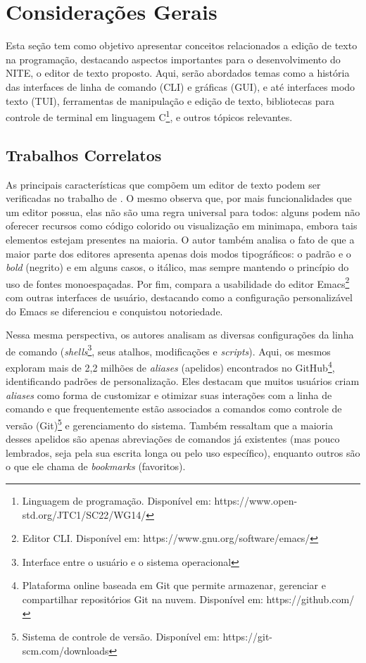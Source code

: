 \chapter{Considerações Gerais}
\label{cap:02}

Esta seção tem como objetivo apresentar conceitos relacionados a edição de texto
na programação, destacando aspectos importantes para o desenvolvimento do NITE,
o editor de texto proposto. Aqui, serão abordados temas como a história das
interfaces de linha de comando (CLI) e gráficas (GUI), e até interfaces modo texto
(TUI), ferramentas de manipulação e edição de texto, bibliotecas para controle de
terminal em linguagem C\footnote{Linguagem de programação. Disponível em: https://www.open-std.org/JTC1/SC22/WG14/},
e outros tópicos relevantes.

\section{Trabalhos Correlatos}

As principais características que compõem um editor de texto podem ser verificadas no
trabalho de . O mesmo observa que, por mais
funcionalidades que um editor possua, elas não são uma
regra universal para todos: alguns podem não oferecer recursos como código colorido
ou visualização em minimapa, embora tais elementos estejam presentes na maioria.
O autor também analisa o fato de que a maior parte dos editores apresenta apenas
dois modos tipográficos: o padrão e o \textit{bold} (negrito) e em alguns casos,
o itálico, mas sempre mantendo o princípio do uso de fontes monoespaçadas. Por
fim, compara a usabilidade do editor Emacs\footnote{Editor CLI. Disponível
em: https://www.gnu.org/software/emacs/} com outras interfaces de usuário, destacando
como a configuração personalizável do Emacs se diferenciou e conquistou notoriedade.

Nessa mesma perspectiva, os autores  analisam as diversas
configurações da linha de comando (\textit{shells}\footnote{Interface entre o
usuário e o sistema operacional}, seus atalhos, modificações e \textit{scripts}). Aqui, os
mesmos exploram mais de 2,2 milhões de \textit{aliases} (apelidos) encontrados
no GitHub\footnote{Plataforma online baseada em Git que permite armazenar, gerenciar
e compartilhar repositórios Git na nuvem. Disponível em: https://github.com/},
identificando padrões de personalização. Eles destacam que muitos usuários criam
\textit{aliases} como forma de customizar e otimizar suas interações com a linha
de comando e que frequentemente estão associados a comandos como controle de
versão (Git)\footnote{Sistema de controle de versão. Disponível em: https://git-scm.com/downloads}
e gerenciamento do sistema. Também ressaltam que a maioria desses apelidos são
apenas abreviações de comandos já existentes (mas pouco lembrados, seja pela sua
escrita longa ou pelo uso específico), enquanto outros são o que ele chama de
\textit{bookmarks} (favoritos).

